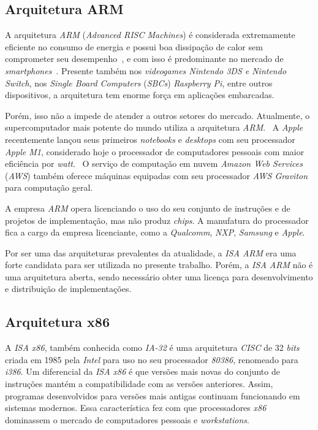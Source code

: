     \subsection{Arquitetura ARM}
    { A arquitetura \textit{ARM} (\textit{Advanced RISC Machines}) é considerada
        extremamente eficiente no consumo de energia e possui boa dissipação de
        calor sem comprometer seu desempenho~\cite{arm_facts1988}, e com isso é
        predominante no mercado de \textit{smartphones}~\cite{arm_milestone}.
        Presente também nos \textit{videogames Nintendo 3DS e Nintendo Switch},
        nos \textit{Single Board Computers} (\textit{SBCs}) \textit{Raspberry Pi},
        entre outros dispositivos, a arquitetura tem enorme força em aplicações
        embarcadas.
    }

    { Porém, isso não a impede de atender a outros setores do mercado. Atualmente,
        o supercomputador mais potente do mundo utiliza a arquitetura
        \textit{ARM}.~\cite{arm_super} A \textit{Apple} recentemente lançou seus
        primeiros \textit{notebooks} e \textit{desktops} com seu processador
        \textit{Apple M1}, considerado hoje o processador de computadores pessoais
        com maior eficiência por \textit{watt}.~\cite{arm_m1} O serviço de
        computação em nuvem \textit{Amazon Web Services} (\textit{AWS})
        também oferece máquinas equipadas com seu processador \textit{AWS Graviton}
        para computação geral.
    }

    { A empresa \textit{ARM} opera licenciando o uso do seu conjunto de instruções
        e de projetos de implementação, mas não produz \textit{chips}. A manufatura
        do processador fica a cargo da empresa licenciante, como a \textit{Qualcomm},
        \textit{NXP}, \textit{Samsung} e \textit{Apple}.
    }

    { Por ser uma das arquiteturas prevalentes da atualidade, a \textit{ISA ARM}
        era uma forte candidata para ser utilizada no presente trabalho. Porém,
        a \textit{ISA ARM} não é uma arquitetura aberta, sendo necessário obter
        uma licença para desenvolvimento e distribuição de implementações.
    }

    \subsection{Arquitetura x86}
    { A \textit{ISA x86}, também conhecida como \textit{IA-32} é uma arquitetura
        \textit{CISC} de 32 \textit{bits} criada em 1985 pela \textit{Intel}
        para uso no seu processador \textit{80386}, renomeado para \textit{i386}.
        Um diferencial da \textit{ISA x86} é que versões mais novas do conjunto
        de instruções mantém a compatibilidade com as versões anteriores.
        Assim, programas desenvolvidos para versões mais antigas continuam
        funcionando em sistemas modernos. Essa característica fez com que
        processadores \textit{x86} dominassem o mercado de computadores pessoais
        e \textit{workstations}.
    }

